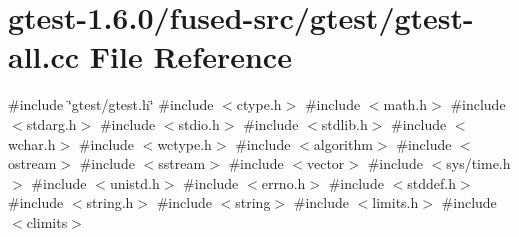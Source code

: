 \hypertarget{fused-src_2gtest_2gtest-all_8cc}{\section{gtest-\/1.6.0/fused-\/src/gtest/gtest-\/all.cc \-File \-Reference}
\label{dc/dba/fused-src_2gtest_2gtest-all_8cc}
}
{\ttfamily \#include \char`\"{}gtest/gtest.\-h\char`\"{}}\*
{\ttfamily \#include $<$ctype.\-h$>$}\*
{\ttfamily \#include $<$math.\-h$>$}\*
{\ttfamily \#include $<$stdarg.\-h$>$}\*
{\ttfamily \#include $<$stdio.\-h$>$}\*
{\ttfamily \#include $<$stdlib.\-h$>$}\*
{\ttfamily \#include $<$wchar.\-h$>$}\*
{\ttfamily \#include $<$wctype.\-h$>$}\*
{\ttfamily \#include $<$algorithm$>$}\*
{\ttfamily \#include $<$ostream$>$}\*
{\ttfamily \#include $<$sstream$>$}\*
{\ttfamily \#include $<$vector$>$}\*
{\ttfamily \#include $<$sys/time.\-h$>$}\*
{\ttfamily \#include $<$unistd.\-h$>$}\*
{\ttfamily \#include $<$errno.\-h$>$}\*
{\ttfamily \#include $<$stddef.\-h$>$}\*
{\ttfamily \#include $<$string.\-h$>$}\*
{\ttfamily \#include $<$string$>$}\*
{\ttfamily \#include $<$limits.\-h$>$}\*
{\ttfamily \#include $<$climits$>$}\*
